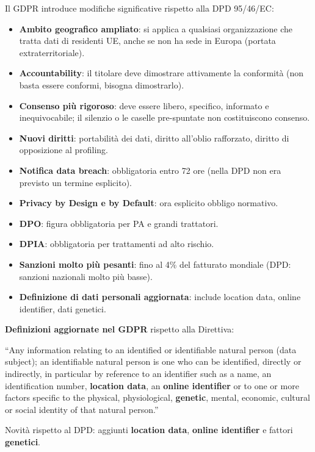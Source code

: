 \documentclass[a4paper,11pt]{article}
\begin{document}
\begin{nota}
Il GDPR introduce modifiche significative rispetto alla DPD 95/46/EC:
\begin{itemize}
  \item \textbf{Ambito geografico ampliato}: si applica a qualsiasi organizzazione che tratta dati di residenti UE, anche se non ha sede in Europa (portata extraterritoriale).
  \item \textbf{Accountability}: il titolare deve dimostrare attivamente la conformità (non basta essere conformi, bisogna dimostrarlo).
  \item \textbf{Consenso più rigoroso}: deve essere libero, specifico, informato e inequivocabile; il silenzio o le caselle pre-spuntate non costituiscono consenso.
  \item \textbf{Nuovi diritti}: portabilità dei dati, diritto all'oblio rafforzato, diritto di opposizione al profiling.
  \item \textbf{Notifica data breach}: obbligatoria entro 72 ore (nella DPD non era previsto un termine esplicito).
  \item \textbf{Privacy by Design e by Default}: ora esplicito obbligo normativo.
  \item \textbf{DPO}: figura obbligatoria per PA e grandi trattatori.
  \item \textbf{DPIA}: obbligatoria per trattamenti ad alto rischio.
  \item \textbf{Sanzioni molto più pesanti}: fino al 4\% del fatturato mondiale (DPD: sanzioni nazionali molto più basse).
  \item \textbf{Definizione di dati personali aggiornata}: include location data, online identifier, dati genetici.
\end{itemize}
\end{nota}

\textbf{Definizioni aggiornate nel GDPR} rispetto alla Direttiva:

\begin{definizione}
``Any information relating to an identified or identifiable natural person (data subject); an identifiable natural person is one who can be identified, directly or indirectly, in particular by reference to an identifier such as a name, an identification number, \textbf{location data}, an \textbf{online identifier} or to one or more factors specific to the physical, physiological, \textbf{genetic}, mental, economic, cultural or social identity of that natural person.''

Novit\`{a} rispetto al DPD: aggiunti \textbf{location data}, \textbf{online identifier} e fattori \textbf{genetici}.
\end{definizione}
\end{document}
